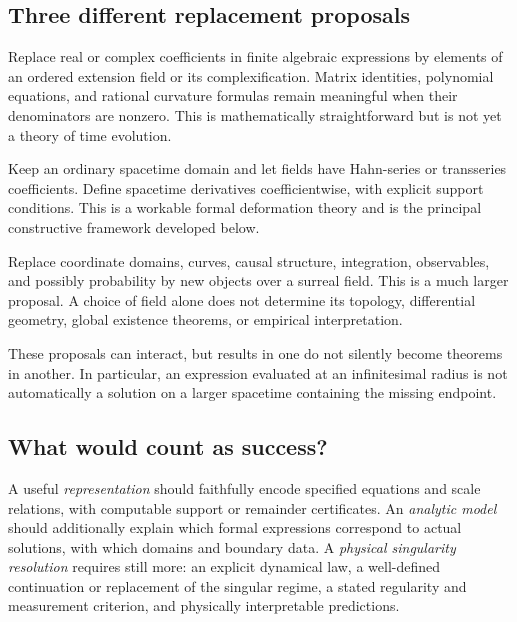 \documentclass[11pt,a4paper]{article}
\numberwithin{equation}{section}
\theoremstyle{definition}
\theoremstyle{remark}
\begin{document}
\subsection{Three different replacement proposals}
\begin{description}[style=nextline,leftmargin=0pt,labelsep=0pt]
\item[Algebraic scalar extension.]
Replace real or complex coefficients in finite algebraic expressions by elements of an ordered extension field or its complexification. Matrix identities, polynomial equations, and rational curvature formulas remain meaningful when their denominators are nonzero. This is mathematically straightforward but is not yet a theory of time evolution.
\item[Fields with non-Archimedean coefficients on real spacetime.]
Keep an ordinary spacetime domain and let fields have Hahn-series or transseries coefficients. Define spacetime derivatives coefficientwise, with explicit support conditions. This is a workable formal deformation theory and is the principal constructive framework developed below.
\item[A genuinely non-Archimedean spacetime.]
Replace coordinate domains, curves, causal structure, integration, observables, and possibly probability by new objects over a surreal field. This is a much larger proposal. A choice of field alone does not determine its topology, differential geometry, global existence theorems, or empirical interpretation.
\end{description}

These proposals can interact, but results in one do not silently become theorems in another. In particular, an expression evaluated at an infinitesimal radius is not automatically a solution on a larger spacetime containing the missing endpoint.

\subsection{What would count as success?}
A useful \emph{representation} should faithfully encode specified equations and scale relations, with computable support or remainder certificates. An \emph{analytic model} should additionally explain which formal expressions correspond to actual solutions, with which domains and boundary data. A \emph{physical singularity resolution} requires still more: an explicit dynamical law, a well-defined continuation or replacement of the singular regime, a stated regularity and measurement criterion, and physically interpretable predictions.
\end{document}
